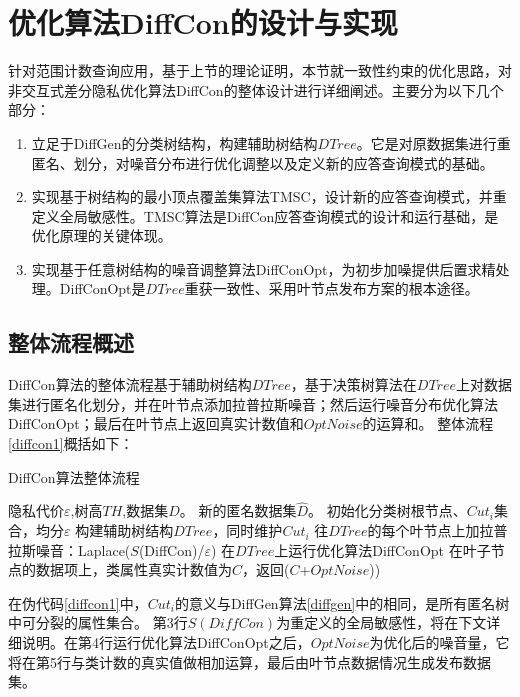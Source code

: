\section{优化算法DiffCon的设计与实现}

针对范围计数查询应用，基于上节的理论证明，本节就一致性约束的优化思路，对非交互式差分隐私优化算法DiffCon的整体设计进行详细阐述。主要分为以下几个部分：
\begin{enumerate}
	\item 立足于DiffGen的分类树结构，构建辅助树结构$DTree$。它是对原数据集进行重匿名、划分，对噪音分布进行优化调整以及定义新的应答查询模式的基础。
	\item 实现基于树结构的最小顶点覆盖集算法TMSC，设计新的应答查询模式，并重定义全局敏感性。TMSC算法是DiffCon应答查询模式的设计和运行基础，是优化原理的关键体现。
	\item 实现基于任意树结构的噪音调整算法DiffConOpt，为初步加噪提供后置求精处理。DiffConOpt是$DTree$重获一致性、采用叶节点发布方案的根本途径。
\end{enumerate}

\subsection{整体流程概述}

DiffCon算法的整体流程基于辅助树结构$DTree$，基于决策树算法在$DTree$上对数据集进行匿名化划分，并在叶节点添加拉普拉斯噪音；然后运行噪音分布优化算法DiffConOpt；最后在叶节点上返回真实计数值和$OptNoise$的运算和。
整体流程\ref{diffcon1}概括如下：
\begin{algorithm}
	\caption{DiffCon算法整体流程} 
	\label{diffcon1}
	\begin{algorithmic}[1]
		\REQUIRE 隐私代价$\varepsilon$,树高$TH$,数据集$D$。
		\ENSURE 新的匿名数据集$\hat{D}$。
		\STATE 初始化分类树根节点、$Cut_{i}$集合，均分$\varepsilon$
		\STATE 构建辅助树结构$DTree$，同时维护$Cut_{i}$
		\STATE 往$DTree$的每个叶节点上加拉普拉斯噪音：Laplace($S$(DiffCon)/$\varepsilon$)
		\STATE 在$DTree$上运行优化算法DiffConOpt
		\RETURN 在叶子节点的数据项上，类属性真实计数值为$C$，返回($C$+$OptNoise$))
	\end{algorithmic}
\end{algorithm} 

在伪代码\ref{diffcon1}中，$Cut_{i}$的意义与DiffGen算法\ref{diffgen}中的相同，是所有匿名树中可分裂的属性集合。
第3行$S(DiffCon)$为重定义的全局敏感性，将在下文详细说明。在第4行运行优化算法DiffConOpt之后，$OptNoise$为优化后的噪音量，它将在第5行与类计数的真实值做相加运算，最后由叶节点数据情况生成发布数据集。

